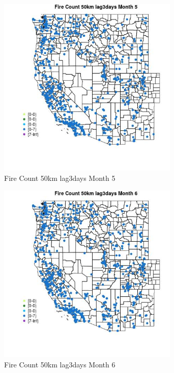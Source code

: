 \begin{figure} 
\centering  
\includegraphics[width=0.77\textwidth]{Code_Outputs/Report_ML_input_PM25_Step4_part_e_de_duplicated_aves_compiled_2019-05-21wNAs_MapObsMo5Fire_Count_50km_lag3days.jpg} 
\caption{\label{fig:Report_ML_input_PM25_Step4_part_e_de_duplicated_aves_compiled_2019-05-21wNAsMapObsMo5Fire_Count_50km_lag3days}Fire Count 50km lag3days Month 5} 
\end{figure} 
 

\begin{figure} 
\centering  
\includegraphics[width=0.77\textwidth]{Code_Outputs/Report_ML_input_PM25_Step4_part_e_de_duplicated_aves_compiled_2019-05-21wNAs_MapObsMo6Fire_Count_50km_lag3days.jpg} 
\caption{\label{fig:Report_ML_input_PM25_Step4_part_e_de_duplicated_aves_compiled_2019-05-21wNAsMapObsMo6Fire_Count_50km_lag3days}Fire Count 50km lag3days Month 6} 
\end{figure} 
 

